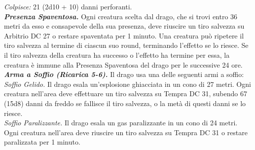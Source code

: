\begin{multicols}{2}
\emph{Colpisce:} 21 (2d10 + 10) danni perforanti.\\
\emph{\textbf{Presenza Spaventosa.}} Ogni creatura scelta dal drago, che si trovi entro 36 metri da esso e consapevole della sua presenza, deve riuscire un tiro salvezza su Arbitrio DC  27 o restare spaventata per 1 minuto. Una creatura può ripetere il tiro salvezza al termine di ciascun suo round, terminando l'effetto se lo riesce. Se il tiro salvezza della creatura ha successo o l'effetto ha termine per essa, la creatura è immune alla Presenza Spaventosa del drago per le successive 24 ore.\\
\emph{\textbf{Arma a Soffio (Ricarica 5-6).}} Il drago usa una delle seguenti armi a soffio:\\
\emph{Soffio Gelido.} Il drago esala un'esplosione ghiacciata in un cono di 27 metri. Ogni creatura nell'area deve effettuare un tiro salvezza su Tempra DC  31, subendo 67 (15d8) danni da freddo se fallisce il tiro salvezza, o la metà di questi danni se lo riesce.\\
\emph{Soffio Paralizzante.} Il drago esala un gas paralizzante in un cono di 24 metri. Ogni creatura nell'area deve riuscire un tiro salvezza su Tempra DC  31 o restare paralizzata per 1 minuto.\\


\end{multicols}
